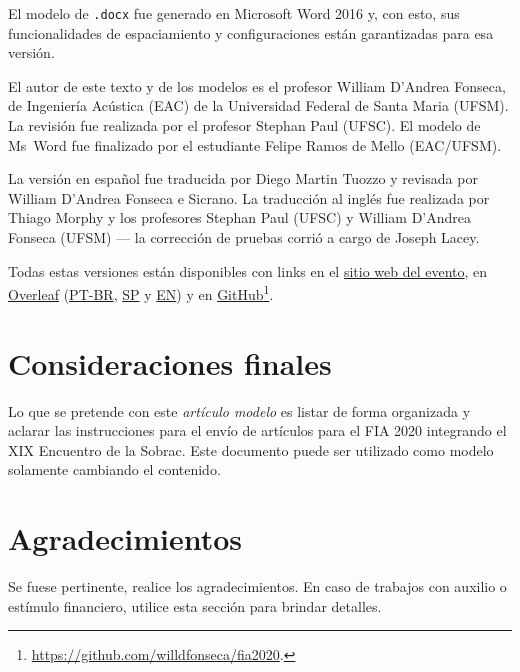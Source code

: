 \documentclass[12pt, a4paper, twoside, twocolumn]{article}
\begin{document}
El modelo de \texttt{.docx} fue generado en Microsoft Word 2016 y, con esto, sus funcionalidades de espaciamiento y configuraciones están garantizadas para esa versión.

El autor de este texto y de los modelos es el profesor William D'Andrea Fonseca, de Ingeniería Acústica (EAC) de la Universidad Federal de Santa Maria (UFSM).
%
La revisión fue realizada por el profesor Stephan Paul (UFSC).
El modelo de Ms~Word fue finalizado por el estudiante Felipe Ramos de Mello (EAC/UFSM).

La versión en español fue traducida por Diego Martin Tuozzo y revisada por William D'Andrea Fonseca e Sicrano.
%
La traducción al inglés fue realizada por Thiago Morphy y los profesores Stephan Paul (UFSC) y William D'Andrea Fonseca (UFSM) --- la corrección de pruebas corrió a cargo de Joseph Lacey. 

Todas estas versiones están disponibles con links en el \href{http://fia2020.com.br}{sitio web del evento}, en \href{https://www.overleaf.com/read/rszcxtwshzfr}{Overleaf} (\href{https://www.overleaf.com/read/rnfjxkknksnd}{PT-BR}, \href{https://www.overleaf.com/read/rszcxtwshzfr}{SP} y \href{https://www.overleaf.com/read/hgryywpgmxdx}{EN}) y en \href{https://github.com/willdfonseca/fia2020}{GitHub}\footnote{\url{https://github.com/willdfonseca/fia2020}.}.

\section{Consideraciones finales}

Lo que se pretende con este \textit{artículo modelo} es listar de forma organizada y aclarar las instrucciones para el envío de artículos para el FIA 2020 integrando el XIX Encuentro de la Sobrac. Este documento puede ser utilizado como modelo solamente cambiando el contenido.

\section{Agradecimientos}

Se fuese pertinente, realice los agradecimientos.
%
En caso de trabajos con auxilio o estímulo financiero, utilice esta sección para brindar detalles.
\end{document}
